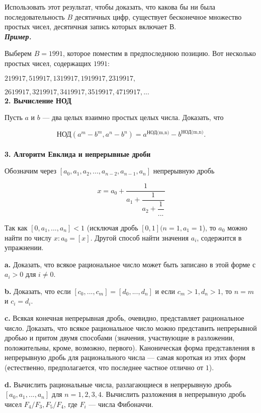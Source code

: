Использовать этот результат, чтобы доказать, что какова бы ни была последовательность $B$ десятичных цифр, существует бесконечное множество простых чисел, десятичная запись которых включает $В$.
\\

\noindent \textbf{\textit{Пример.}}

Выберем $B = 1991$, которое поместим в предпоследнюю позицию.
Вот несколько простых чисел, содержащих $1991$:

$219917, 519917, 1319917, 1919917, 2319917,$

$2619917, 3219917, 3419917, 3519917, 4719917, ...$
\\

\noindent \textbf{2. Вычисление НОД}

Пусть $a$ и $b$ — два целых взаимно простых целых числа. Доказать,
что

\[
\text{НОД}(a^m-b^m,a^n-b^n)=a^{\text{НОД(m,n)}}-b^{\text{НОД(m,n)}}.
\]
\\

\noindent \textbf{3. Алгоритм Евклида и непрерывные дроби}

Обозначим через $[a_0,a_1,a_2,...,a_{n-2},a_{n-1},a_{n}]$ непрерывную дробь

\[
x = a_0+\dfrac{1}{a_1+\dfrac{1}{a_2+\dfrac{1}{...}}}
\]

\noindent Так как $[0,a_1,...,a_n] < 1$ (исключая дробь $[0,1] (n=1,a_1=1$), то $a_0$
можно найти по числу $x: a_0=[x]$. Другой способ найти значения $a_i$,
содержится в упражнении.

\textbf{a.} Доказать, что всякое рациональное число может быть записано
в этой форме с $a_i>0$ для $i \ne 0$.

\textbf{b.} Доказать, что если $[c_0,...,c_m]=[d_0,...,d_n]$ и если $c_m>1,d_n>1$, то $n=m$ и $c_i=d_i$.

\textbf{c.} Всякая конечная непрерывная дробь, очевидно, представляет 
рациональное число. Доказать, что всякое рациональное число можно
представить непрерывной дробью и притом двумя способами 
(значения, участвующие в разложении, положительны, кроме, возможно, 
первого). Каноническая форма представления в непрерывную дробь для
рационального числа — самая короткая из этих форм (естественно,
предполагается, что последнее частное отлично от $1$).

\textbf{d.} Вычислить рациональные числа, разлагающиеся в непрерывную
дробь $[a_0,a_1,...,a_n]$ для $n=1,2,3,4$. Вычислить разложения в 
непрерывную дробь чисел $F_4/F_3,F_5/F_4$, где $F_i$ — числа Фибоначчи.
\\

